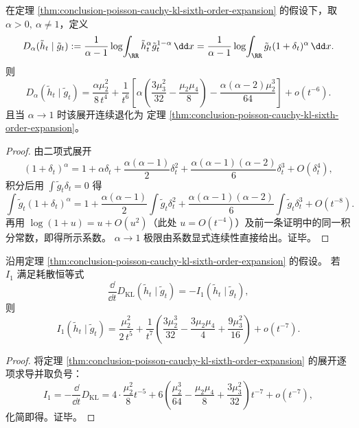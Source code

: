 \begin{theorem}\label{thm:conclusion-poisson-cauchy-renyi-sixth-order-expansion}
在定理 \ref{thm:conclusion-poisson-cauchy-kl-sixth-order-expansion} 的假设下，取 \(\alpha>0,\ \alpha\neq 1\)，定义
\[
D_\alpha(\tilde h_t\mid \tilde g_t)
:=
\frac{1}{\alpha-1}\log\!\int_{\RR}\tilde h_t^\alpha \tilde g_t^{1-\alpha}\,\dd x
=
\frac{1}{\alpha-1}\log\!\int_{\RR}\tilde g_t(1+\delta_t)^\alpha\,\dd x.
\]
则
\[
D_\alpha(\tilde h_t\mid \tilde g_t)
=
\frac{\alpha\mu_2^2}{8\,t^4}
+
\frac1{t^6}\left[
\alpha\left(\frac{3\mu_3^2}{32}-\frac{\mu_2\mu_4}{8}\right)
-\frac{\alpha(\alpha-2)\mu_2^3}{64}
\right]
+o(t^{-6}).
\]
且当 \(\alpha\to 1\) 时该展开连续退化为
定理 \ref{thm:conclusion-poisson-cauchy-kl-sixth-order-expansion}。
\end{theorem}
\begin{proof}
由二项式展开
\[
(1+\delta_t)^\alpha
=
1+\alpha\delta_t+\frac{\alpha(\alpha-1)}{2}\delta_t^2+\frac{\alpha(\alpha-1)(\alpha-2)}{6}\delta_t^3+O(\delta_t^4),
\]
积分后用 \(\int \tilde g_t\delta_t=0\) 得
\[
\int \tilde g_t(1+\delta_t)^\alpha
=
1+\frac{\alpha(\alpha-1)}{2}\int\tilde g_t\delta_t^2
+
\frac{\alpha(\alpha-1)(\alpha-2)}{6}\int\tilde g_t\delta_t^3
+O(t^{-8}).
\]
再用 \(\log(1+u)=u+O(u^2)\)（此处 \(u=O(t^{-4})\)）及前一条证明中的同一积分常数，即得所示系数。
\(\alpha\to1\) 极限由系数显式连续性直接给出。证毕。
\end{proof}

\begin{corollary}[信息耗散泛函的七阶精细渐近]\label{cor:conclusion-poisson-cauchy-i1-seventh-order-expansion}
沿用定理 \ref{thm:conclusion-poisson-cauchy-kl-sixth-order-expansion} 的假设。
若 \(I_1\) 满足耗散恒等式
\[
\frac{\dd}{\dd t}D_{\mathrm{KL}}(\tilde h_t\mid \tilde g_t)=-I_1(\tilde h_t\mid \tilde g_t),
\]
则
\[
I_1(\tilde h_t\mid \tilde g_t)
=
\frac{\mu_2^2}{2\,t^5}
+
\frac1{t^7}
\left(
\frac{3\mu_2^3}{32}
-\frac{3\mu_2\mu_4}{4}
+\frac{9\mu_3^2}{16}
\right)
+o(t^{-7}).
\]
\end{corollary}
\begin{proof}
将定理 \ref{thm:conclusion-poisson-cauchy-kl-sixth-order-expansion} 的展开逐项求导并取负号：
\[
I_1=-\frac{\dd}{\dd t}D_{\mathrm{KL}}
=4\cdot\frac{\mu_2^2}{8}t^{-5}
+6\left(
\frac{\mu_2^3}{64}
-\frac{\mu_2\mu_4}{8}
+\frac{3\mu_3^2}{32}
\right)t^{-7}
+o(t^{-7}),
\]
化简即得。证毕。
\end{proof}

